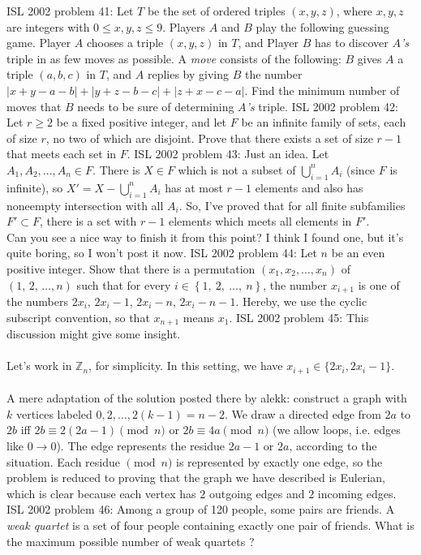 ISL 2002 problem 41:  Let $T$ be the set of ordered triples $(x,y,z)$, where $x,y,z$ are integers with $0\leq x,y,z\leq9$. Players $A$ and $B$ play the following guessing game. Player $A$ chooses a triple $(x,y,z)$ in $T$, and Player $B$ has to discover $A$\textit{'s} triple in as few moves as possible.  A \textit{move} consists of the following: $B$ gives $A$ a triple $(a,b,c)$ in $T$, and $A$ replies by giving $B$ the number $\left|x+y-a-b\right |+\left|y+z-b-c\right|+\left|z+x-c-a\right|$. Find the minimum number of moves that $B$ needs to be sure of determining $A$\textit{'s}  triple. 
ISL 2002 problem 42:  Let $r\geq2$ be a fixed positive integer, and let $F$ be an infinite family of sets, each of size $r$, no two of which are disjoint. Prove that there exists a set of size $r-1$ that meets each set in $F$. 
ISL 2002 problem 43:  Just an idea. Let $A_1,A_2,...,A_n \in F$. There is $X \in F$ which is not a subset of $\bigcup_{i=1}^n{A_i}$ (since $F$ is infinite), so $X'=X-\bigcup_{i=1}^n{A_i}$ has at most $r-1$ elements and also has noneempty intersection with all $A_i$. So, I've proved that for all finite subfamilies $F' \subset F$, there is a set with $r-1$ elements which meets all elements in $F'$. \\
Can you see a nice way to finish it from this point? I think I found one, but it's quite boring, so I won't post it now. 
ISL 2002 problem 44:  Let $n$ be an even positive integer. Show that there is a permutation $\left(x_1,x_2,\ldots,x_n\right)$ of $\left(1,\,2,\,\ldots,n\right)$ such that for every $i\in\left\{1,\ 2,\ ...,\ n\right\}$, the number $x_{i+1}$ is one of the numbers $2x_i$, $2x_i-1$, $2x_i-n$, $2x_i-n-1$. Hereby, we use the cyclic subscript convention, so that $x_{n+1}$ means $x_1$. 
ISL 2002 problem 45:  This discussion might give some insight. \\\\
Let's work in $\mathbb Z_n$, for simplicity. In this setting, we have $x_{i+1}\in\{2x_i,2x_i-1\}$. \\\\
A mere adaptation of the solution posted there by alekk: construct a graph with $k$ vertices labeled $0,2,\ldots,2(k-1)=n-2$. We draw a directed edge from $2a$ to $2b$ iff $2b\equiv 2(2a-1)\pmod n$ or $2b\equiv 4a\pmod n$ (we allow loops, i.e. edges like $0\to 0$). The edge represents the residue $2a-1$ or $2a$, according to the situation. Each residue $\pmod n$ is represented by exactly one edge, so the problem is reduced to proving that the graph we have described is Eulerian, which is clear because each vertex has $2$ outgoing edges and $2$ incoming edges. 
ISL 2002 problem 46:  Among a group of 120 people, some pairs are friends. A \textit{weak quartet} is a set of four people containing exactly one pair of friends. What is the maximum possible number of weak quartets ? 

